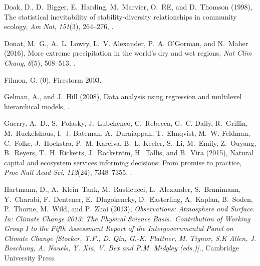 \documentclass[draft,linenumbers]{AGUJournal}
\begin{document}
\begin{thebibliography}{38}
Doak, D., D.~Bigger, E.~Harding, M.~Marvier, O.~{RE}, and D.~Thomson (1998),
		The statistical inevitability of stability{-}diversity relationships in
  community ecology, \textit{Am Nat}, \textit{151}(3), 264--276,
  .

Donat, M.~G., A.~L. Lowry, L.~V. Alexander, P.~A. {O'Gorman}, and N.~Maher
  (2016), More extreme precipitation in the world's dry and wet regions,
  \textit{Nat Clim Chang}, \textit{6}(5), 508--513, .

Filmon, G. (0), Firestorm 2003.

Gelman, A., and J.~Hill (2008), Data analysis using regression and multilevel
  hierarchical models, .

Guerry, A.~D., S.~Polasky, J.~Lubchenco, C.~Rebecca, G.~C. Daily, R.~Griffin,
  M.~Ruckelshaus, I.~J. Bateman, A.~Duraiappah, T.~Elmqvist, M.~W. Feldman,
  C.~Folke, J.~Hoekstra, P.~M. Kareiva, B.~L. Keeler, S.~Li, M.~Emily,
  Z.~Ouyang, B.~Reyers, T.~H. Ricketts, J.~Rockstr{\"o}m, H.~Tallis, and
  B.~Vira (2015), Natural capital and ecosystem services informing decisions:
  From promise to practice, \textit{Proc Natl Acad Sci}, \textit{112}(24),
  7348--7355, .

Hartmann, D., A.~Klein~Tank, M.~Rusticucci, L.~Alexander,
  S.~Brnnimann, Y.~Charabi, F.~Dentener, E.~Dlugokencky,
  D.~Easterling, A.~Kaplan, B.~Soden, P.~Thorne, M.~Wild, and P.~Zhai (2013),
  \textit{Observations: {Atmosphere and Surface}. In: {Climate Change 2013}:
  The Physical Science Basis.~Contribution of Working Group I to the Fifth
  Assessment Report of the {Intergovernmental Panel on Climate Change}
  {[Stocker, T.F., D. Qin, G.-K. Plattner, M. Tignor, S.K Allen, J. Boschung,
  A. Nauels, Y. Xia, V. Bex and P.M. Midgley (eds.)].}}, Cambridge University
  Press.


\end{thebibliography}
\end{document}
